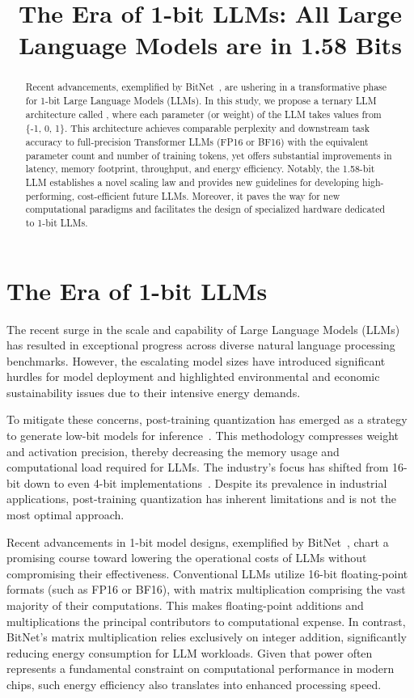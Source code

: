 \title{The Era of 1-bit LLMs: All Large Language Models are in 1.58 Bits}

\begin{abstract}
Recent advancements, exemplified by BitNet~\cite{bitnet}, are ushering in a transformative phase for 1-bit Large Language Models (LLMs). In this study, we propose a ternary LLM architecture called \textbf{}, where each parameter (or weight) of the LLM takes values from \{-1, 0, 1\}. This architecture achieves comparable perplexity and downstream task accuracy to full-precision Transformer LLMs (FP16 or BF16) with the equivalent parameter count and number of training tokens, yet offers substantial improvements in latency, memory footprint, throughput, and energy efficiency. Notably, the 1.58-bit LLM establishes a novel scaling law and provides new guidelines for developing high-performing, cost-efficient future LLMs. Moreover, it paves the way for new computational paradigms and facilitates the design of specialized hardware dedicated to 1-bit LLMs.
\end{abstract}

\section{The Era of 1-bit LLMs}

The recent surge in the scale and capability of Large Language Models (LLMs) has resulted in exceptional progress across diverse natural language processing benchmarks. However, the escalating model sizes have introduced significant hurdles for model deployment and highlighted environmental and economic sustainability issues due to their intensive energy demands.

To mitigate these concerns, post-training quantization has emerged as a strategy to generate low-bit models for inference~\cite{smoothquant, gptq, quip, quip_sharp}. This methodology compresses weight and activation precision, thereby decreasing the memory usage and computational load required for LLMs. The industry’s focus has shifted from 16-bit down to even 4-bit implementations~\cite{gptq, awq}. Despite its prevalence in industrial applications, post-training quantization has inherent limitations and is not the most optimal approach.

Recent advancements in 1-bit model designs, exemplified by BitNet~\cite{bitnet}, chart a promising course toward lowering the operational costs of LLMs without compromising their effectiveness. Conventional LLMs utilize 16-bit floating-point formats (such as FP16 or BF16), with matrix multiplication comprising the vast majority of their computations. This makes floating-point additions and multiplications the principal contributors to computational expense. In contrast, BitNet's matrix multiplication relies exclusively on integer addition, significantly reducing energy consumption for LLM workloads. Given that power often represents a fundamental constraint on computational performance in modern chips, such energy efficiency also translates into enhanced processing speed.

